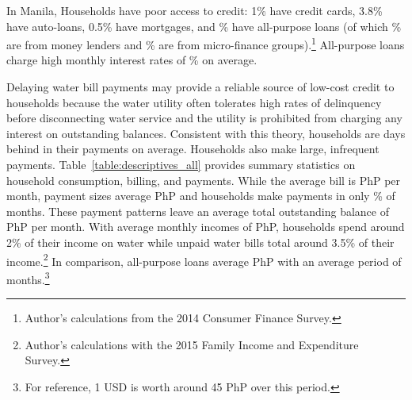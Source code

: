\documentclass[12pt]{article}
\begin{document}

In Manila, Households have poor access to credit: 1\% have credit cards, 3.8\% have auto-loans, 0.5\% have mortgages, and \unskip\% have all-purpose loans (of which \unskip\% are from money lenders and \unskip\% are from micro-finance groups).\footnote{Author's calculations from the 2014 Consumer Finance Survey.}  All-purpose loans charge high monthly interest rates of \unskip\% on average. 

Delaying water bill payments may provide a reliable source of low-cost credit to households because the water utility often tolerates high rates of delinquency before disconnecting water service and the utility is prohibited from charging any interest on outstanding balances.  Consistent with this theory, households are days behind in their payments on average.  Households also make large, infrequent payments.  Table~\ref{table:descriptives_all} provides summary statistics on household consumption, billing, and payments.  While the average bill is PhP per month, payment sizes average PhP and households make payments in only \unskip\% of months.  These payment patterns leave an average total outstanding balance of PhP per month.  With average monthly incomes of PhP, households spend around 2\% of their income on water while unpaid water bills total around 3.5\% of their income.\footnote{Author's calculations with the 2015 Family Income and Expenditure Survey.}  In comparison, all-purpose loans average PhP with an average period of months.\footnote{For reference, 1 USD is worth around 45 PhP over this period.}  
\end{document}
